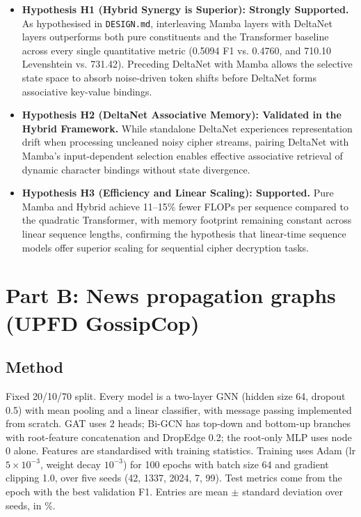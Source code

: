 \documentclass[12pt,a4paper]{article}
\begin{document}
\begin{itemize}
\item \textbf{Hypothesis H1 (Hybrid Synergy is Superior): Strongly Supported.} As hypothesised in \texttt{DESIGN.md}, interleaving Mamba layers with DeltaNet layers outperforms both pure constituents and the Transformer baseline across every single quantitative metric (0.5094 F1 vs. 0.4760, and 710.10 Levenshtein vs. 731.42). Preceding DeltaNet with Mamba allows the selective state space to absorb noise-driven token shifts before DeltaNet forms associative key-value bindings.
\item \textbf{Hypothesis H2 (DeltaNet Associative Memory): Validated in the Hybrid Framework.} While standalone DeltaNet experiences representation drift when processing uncleaned noisy cipher streams, pairing DeltaNet with Mamba's input-dependent selection enables effective associative retrieval of dynamic character bindings without state divergence.
\item \textbf{Hypothesis H3 (Efficiency and Linear Scaling): Supported.} Pure Mamba and Hybrid achieve 11--15\% fewer FLOPs per sequence compared to the quadratic Transformer, with memory footprint remaining constant across linear sequence lengths, confirming the hypothesis that linear-time sequence models offer superior scaling for sequential cipher decryption tasks.
\end{itemize}

\section{Part B: News propagation graphs (UPFD GossipCop)}

\subsection{Method}

Fixed 20/10/70 split. Every model is a two-layer GNN (hidden size 64, dropout 0.5) with mean pooling and a linear classifier, with message passing implemented from scratch. GAT uses 2 heads; Bi-GCN has top-down and bottom-up branches with root-feature concatenation and DropEdge 0.2; the root-only MLP uses node 0 alone. Features are standardised with training statistics. Training uses Adam (lr $5{\times}10^{-3}$, weight decay $10^{-3}$) for 100 epochs with batch size 64 and gradient clipping 1.0, over five seeds (42, 1337, 2024, 7, 99). Test metrics come from the epoch with the best validation F1. Entries are mean $\pm$ standard deviation over seeds, in \%.
\end{document}
